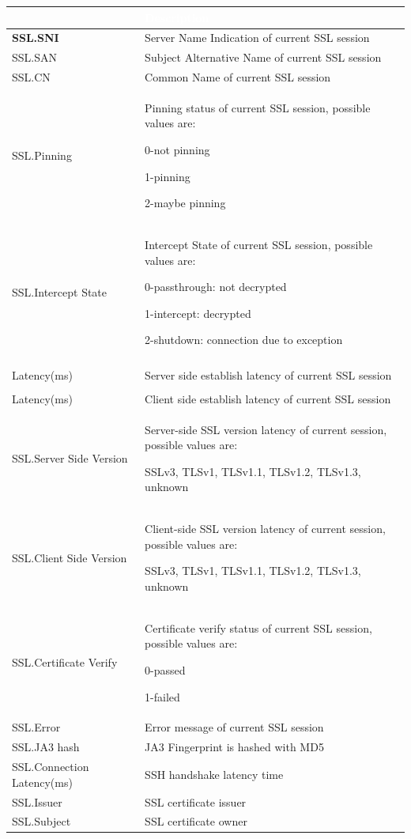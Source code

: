 \begin{longtable}{p{}|p{}}   
    \rowcolor{black}\multicolumn{1}{l!\vlinewhite}{\textcolor{white}{Field}}  & \textcolor{white}{Description} \\\hline
    \textbf{SSL.SNI} &	Server Name Indication of current SSL session \\\hline
    SSL.SAN &	Subject Alternative Name of current SSL session \\\hline
    SSL.CN &	Common Name of current SSL session \\\hline
    SSL.Pinning &	Pinning status of current SSL session, possible values are:


                    0-not pinning 


                    1-pinning 


                    2-maybe pinning \\\hline
    SSL.Intercept State &	Intercept State of current SSL session, possible values are:


                            0-passthrough: not decrypted


                            1-intercept: decrypted


                            2-shutdown: connection due to exception\\\hline
    \tabincell{l}{SSL.Server Side\\ Latency(ms)} &	Server side establish latency of current SSL session \\\hline
    \tabincell{l}{SSL.Client Side\\ Latency(ms)} &	Client side establish latency of current SSL session \\\hline
    SSL.Server Side Version &	Server-side SSL version latency of current session, possible values are:


                                SSLv3, TLSv1, TLSv1.1, TLSv1.2, TLSv1.3, unknown \\\hline
    SSL.Client Side Version &	Client-side SSL version latency of current session, possible values are:


                                SSLv3, TLSv1, TLSv1.1, TLSv1.2, TLSv1.3, unknown \\\hline
    SSL.Certificate Verify &	Certificate verify status of current SSL session, possible values are:


                                0-passed


                                1-failed \\\hline
    SSL.Error &	Error message of current SSL session \\\hline
    SSL.JA3 hash &	JA3 Fingerprint is hashed with MD5 \\\hline
    SSL.Connection Latency(ms)  &	SSH handshake latency time  \\\hline
    SSL.Issuer  &	SSL certificate issuer\\\hline
    SSL.Subject  &	SSL certificate owner\\\hline
                                                               
\end{longtable}


